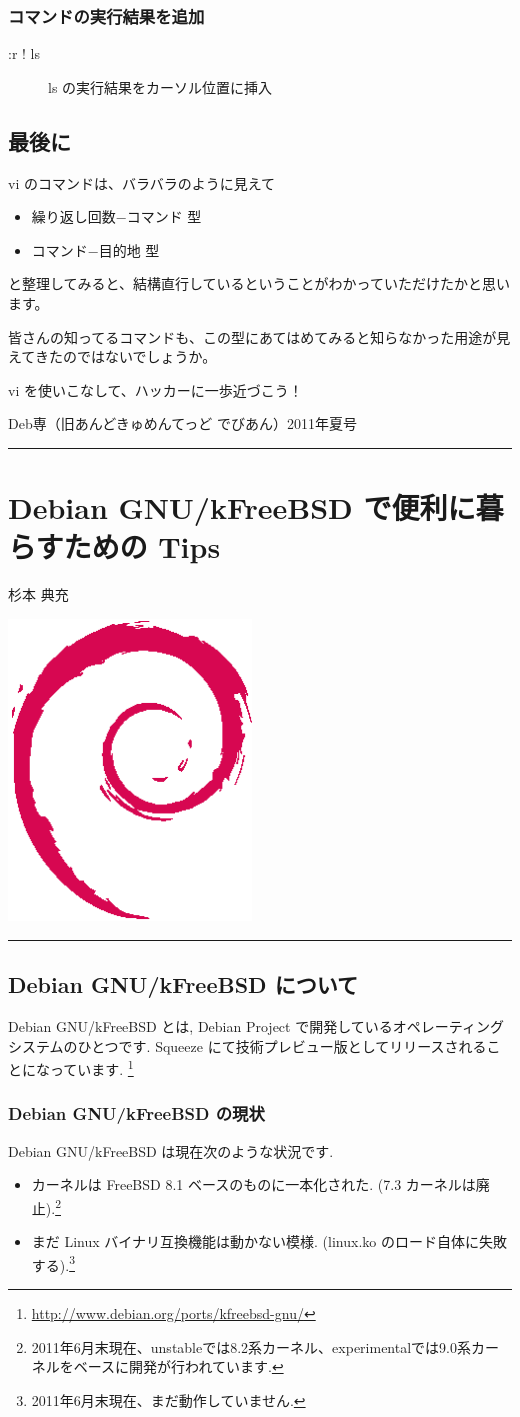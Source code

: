 \documentclass[mingoth,a4paper]{jsarticle}
\renewcommand{\dancersection}[2]{%
\newpage
Deb専（旧あんどきゅめんてっど でびあん）2011年夏号
%
\vspace{0.1mm}\\
{\color{dancerdarkblue}\rule{\hsize}{2mm}}

%
%
\begin{minipage}[t]{0.6\hsize}
\color{dancerdarkblue}
\vspace{1cm}
\section{#1}
\hfill{}#2\\
\end{minipage}
\begin{minipage}[t]{0.4\hsize}
\vspace{-2cm}
\hfill{}\includegraphics[height=8cm]{image200502/openlogo-nd.eps}\\
\vspace{-5cm}
\end{minipage}
%
{\color{dancerlightblue}\rule{0.66\hsize}{2mm}}
%
\vspace{2cm}
}
\begin{document}
\subsubsection{コマンドの実行結果を追加}
\begin{description}
\item[:r ! ls] ls の実行結果をカーソル位置に挿入
\end{description}

\subsection{最後に}

vi のコマンドは、バラバラのように見えて
\begin{itemize}
      \item 繰り返し回数−コマンド 型
      \item コマンド−目的地 型
\end{itemize}

と整理してみると、結構直行しているということがわかっていただけたかと思います。

皆さんの知ってるコマンドも、この型にあてはめてみると知らなかった用途が見えてきたのではないでしょうか。

vi を使いこなして、ハッカーに一歩近づこう！

\dancersection{Debian GNU/kFreeBSD で便利に暮らすための Tips}{杉本 典充}

\subsection{Debian GNU/kFreeBSD について}
Debian GNU/kFreeBSD とは, Debian Project で開発しているオペレーティングシステムのひとつです. Squeeze にて技術プレビュー版としてリリースされることになっています. \footnote{\url{http://www.debian.org/ports/kfreebsd-gnu/}}

\subsubsection{Debian GNU/kFreeBSD の現状}
Debian GNU/kFreeBSD は現在次のような状況です.

\begin{itemize}
  \item カーネルは FreeBSD 8.1 ベースのものに一本化された. (7.3 カーネルは廃止).\footnote{2011年6月末現在、unstableでは8.2系カーネル、experimentalでは9.0系カーネルをベースに開発が行われています.}
  \item まだ Linux バイナリ互換機能は動かない模様. (linux.ko のロード自体に失敗する).\footnote{2011年6月末現在、まだ動作していません.}

\end{itemize}
\end{document}
